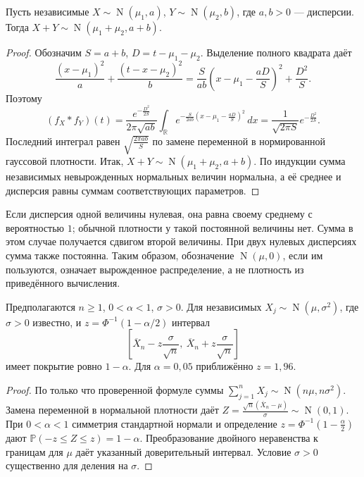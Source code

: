 \ifdim\dimexpr\ht\CatFlowBox+\dp\CatFlowBox\relax<64mm\dp\CatFlowBox=\dimexpr64mm-\ht\CatFlowBox\relax\fi%
\noindent\usebox{\CatFlowBox}\par\addvspace{5pt}
\begin{theorem}\label{thm:normal-convolution}
Пусть независимые \(X\sim\operatorname N(\mu_1,a)\),
\(Y\sim\operatorname N(\mu_2,b)\), где \(a,b>0\) --- дисперсии.
Тогда \(X+Y\sim\operatorname N(\mu_1+\mu_2,a+b)\).\end{theorem}\begin{proof}
Обозначим \(S=a+b\), \(D=t-\mu_1-\mu_2\).
Выделение полного квадрата даёт
\[
 \frac{(x-\mu_1)^2}{a}+\frac{(t-x-\mu_2)^2}{b}
 =\frac{S}{ab}\left(x-\mu_1-\frac{aD}{S}\right)^2+\frac{D^2}{S}.
\]
Поэтому
\[
 (f_X*f_Y)(t)
 =\frac{e^{-\frac{D^2}{2S}}}{2\pi\sqrt{ab}}
   \int_{\mathbb R}
   e^{-\frac{S}{2ab}\left(x-\mu_1-\frac{aD}{S}\right)^2}\,dx
 =\frac{1}{\sqrt{2\pi S}}e^{-\frac{D^2}{2S}}.
\]
Последний интеграл равен \(\sqrt{\frac{2\pi ab}{S}}\) по замене переменной
в нормированной гауссовой плотности.
Итак, \(X+Y\sim\operatorname N(\mu_1+\mu_2,a+b)\).
По индукции сумма независимых невырожденных нормальных величин нормальна,
а её среднее и дисперсия равны суммам соответствующих параметров.\qedhere\end{proof}
Если дисперсия одной величины нулевая, она равна своему среднему с вероятностью \(1\);
обычной плотности у такой постоянной величины нет.
Сумма в этом случае получается сдвигом второй величины.
При двух нулевых дисперсиях сумма также постоянна.
Таким образом, обозначение \(\operatorname N(\mu,0)\), если им пользуются,
означает вырожденное распределение, а не плотность из приведённого вычисления.
\begin{theorem}
Предполагаются \(n\ge1\), \(0<\alpha<1\), \(\sigma>0\).
Для независимых \(X_j\sim\operatorname N(\mu,\sigma^2)\), где \(\sigma>0\) известно, и \(z=\Phi^{-1}(1-\alpha/2)\) интервал
\[
\left[\overline X_n-z\frac\sigma{\sqrt n},\ \overline X_n+z\frac\sigma{\sqrt n}\right]
\]
имеет покрытие ровно \(1-\alpha\). Для \(\alpha=0{,}05\) приближённо \(z=1{,}96\).
\end{theorem}
\begin{proof}
По только что проверенной формуле суммы
\(\sum_{j=1}^nX_j\sim\operatorname N(n\mu,n\sigma^2)\).
Замена переменной в нормальной плотности даёт
\(Z=\frac{\sqrt n(\overline X_n-\mu)}{\sigma}\sim\operatorname N(0,1)\).
При \(0<\alpha<1\) симметрия стандартной нормали и определение
\(z=\Phi^{-1}(1-\frac{\alpha}{2})\) дают
\(\mathbb P(-z\le Z\le z)=1-\alpha\).
Преобразование двойного неравенства к границам для \(\mu\)
даёт указанный доверительный интервал.
Условие \(\sigma>0\) существенно для деления на \(\sigma\).
\end{proof}
